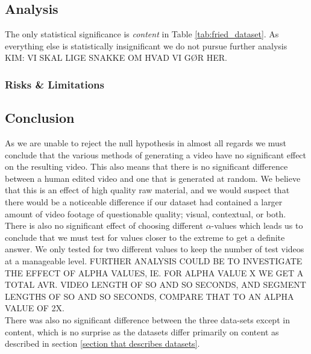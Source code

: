 \subsection{Analysis}
%
The only statistical significance is \textit{content} in Table \ref{tab:fried_dataset}. As everything else is statistically insignificant we do not pursue further analysis KIM: VI SKAL LIGE SNAKKE OM HVAD VI GØR HER.
%
\subsubsection{Risks \& Limitations}
%
%
\subsection{Conclusion}
%
As we are unable to reject the null hypothesis in almost all regards we must conclude that the various methods of generating a video have no significant effect on the resulting video. This also means that there is no significant difference between a human edited video and one that is generated at random. We believe that this is an effect of high quality raw material, and we would suspect that there would be a noticeable difference if our dataset had contained a larger amount of video footage of questionable quality; visual, contextual, or both.\\
There is also no significant effect of choosing different $\alpha$-values which leads us to conclude that we must test for values closer to the extreme to get a definite answer. We only tested for two different values to keep the number of test videos at a manageable level. FURTHER ANALYSIS COULD BE TO INVESTIGATE THE EFFECT OF ALPHA VALUES, IE. FOR ALPHA VALUE X WE GET A TOTAL AVR. VIDEO LENGTH OF SO AND SO SECONDS, AND SEGMENT LENGTHS OF SO AND SO SECONDS, COMPARE THAT TO AN ALPHA VALUE OF 2X.\\
There was also no significant difference between the three data-sets except in content, which is no surprise as the datasets differ primarily on content as described in section \ref{section that describes datasets}.
%